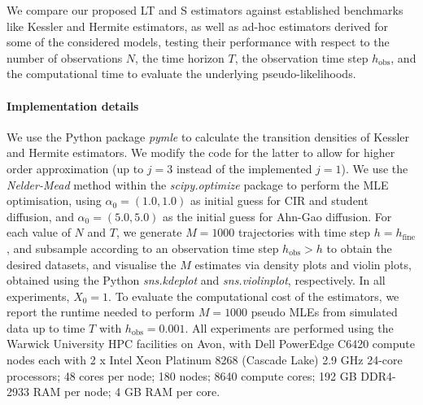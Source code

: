\documentclass[a4paper,12pt]{article}
\numberwithin{equation}{section}
\theoremstyle{plain}
\theoremstyle{definition}
\begin{document}
We compare our proposed LT and S estimators against established benchmarks like Kessler and  Hermite estimators, as well as ad-hoc estimators  derived for some of the considered models, testing their performance with respect to the number of observations $N$, the time horizon $T$, the observation time step $h_\textrm{obs}$, and the computational time to evaluate the underlying pseudo-likelihoods.

\paragraph*{Implementation details} We use the Python package \textit{pymle} \cite{kirkby2025pymle} to calculate the transition densities of Kessler and Hermite estimators. We modify the code for the latter to allow for higher order approximation (up to $j=3$ instead of the implemented $j=1$). We use the \textit{Nelder-Mead} method within the \textit{scipy.optimize} package to perform the MLE optimisation, using $\alpha_0=(1.0,1.0)$ as initial guess for CIR and student diffusion, and $\alpha_0=(5.0,5.0)$ as the initial guess for Ahn-Gao diffusion. For each value of $N$ and $T$, we generate $M=1000$ trajectories with time step $h=h_\textrm{fine}$, and subsample according to an observation time step $h_\textrm{obs}>h$ to obtain  the desired datasets, and visualise the $M$ estimates via density plots and violin plots, obtained using the Python \textit{sns.kdeplot} and \textit{sns.violinplot}, respectively. In all experiments, $X_0=1$. To evaluate the computational cost of the estimators, we report the runtime needed to perform $M=1000$ pseudo MLEs from simulated data up to time $T$ with $h_\textrm{obs}=0.001$. All
experiments are performed using the Warwick
University HPC facilities on Avon, with
Dell PowerEdge C6420 compute nodes each with 2 x Intel Xeon Platinum 8268 (Cascade Lake) 2.9 GHz 24-core processors; 48 cores per node; 180 nodes; 8640 compute cores; 192 GB DDR4-2933 RAM per node; 4 GB RAM per core. 
\end{document}
